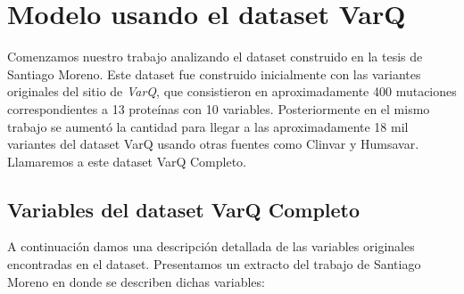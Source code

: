 \section{Modelo usando el dataset VarQ}

Comenzamos nuestro trabajo analizando el dataset construido en la tesis de Santiago Moreno. Este dataset fue construido inicialmente con las variantes originales del sitio de \textit{VarQ}, que consistieron en aproximadamente 400 mutaciones correspondientes a 13 proteínas con 10 variables. Posteriormente en el mismo trabajo se aumentó la cantidad para llegar a las aproximadamente 18 mil variantes del dataset VarQ usando otras fuentes como Clinvar y Humsavar. Llamaremos a este dataset VarQ Completo. 

\subsection{Variables del dataset VarQ Completo}

A continuación damos una descripción detallada de las variables originales encontradas en el dataset. Presentamos un extracto del trabajo de Santiago Moreno en donde se describen dichas variables: 

